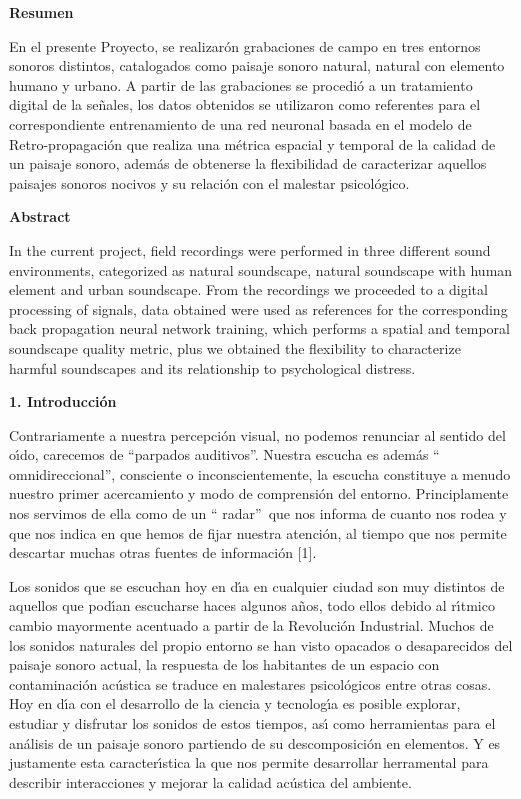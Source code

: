 \textbf{Resumen }

En el presente Proyecto, se realizar\'{o}n grabaciones de campo en tres
entornos sonoros distintos, catalogados como paisaje sonoro natural, natural
con elemento humano y urbano. A partir de las grabaciones se procedi\'{o} a un
tratamiento digital de la se\~{n}ales, los datos obtenidos se utilizaron como
referentes para el correspondiente entrenamiento de una red neuronal basada en
el modelo de Retro-propagaci\'{o}n que realiza una m\'{e}trica espacial y
temporal de la calidad de un paisaje sonoro, adem\'{a}s de obtenerse la
flexibilidad de caracterizar aquellos paisajes sonoros nocivos y su
relaci\'{o}n con el malestar psicol\'{o}gico.

\textbf{Abstract }

In the current project, field recordings were performed in three different
sound environments, categorized as natural soundscape, natural soundscape with
human element and urban soundscape. From the recordings we proceeded to a
digital processing of signals, data obtained were used as references for the
corresponding back propagation neural network training, which performs a
spatial and temporal soundscape quality metric, plus we obtained the
flexibility to characterize harmful soundscapes and its relationship to
psychological distress.

\textbf{1. Introducci\'{o}n}

Contrariamente a nuestra percepci\'{o}n visual, no podemos renunciar al
sentido del o\'{\i}do, carecemos de \textquotedblleft parpados
auditivos\textquotedblright. Nuestra escucha es adem\'{a}s \textquotedblleft
omnidireccional\textquotedblright, consciente o inconscientemente, la escucha
constituye a menudo nuestro primer acercamiento y modo de comprensi\'{o}n del
entorno. Principlamente nos servimos de ella como de un \textquotedblleft
radar\textquotedblright\ que nos informa de cuanto nos rodea y que nos indica
en que hemos de fijar nuestra atenci\'{o}n, al tiempo que nos permite
descartar muchas otras fuentes de informaci\'{o}n [1].

Los sonidos que se escuchan hoy en d\'{\i}a en cualquier ciudad son muy
distintos de aquellos que pod\'{\i}an escucharse haces algunos a\~{n}os, todo
ellos debido al r\'{\i}tmico cambio mayormente acentuado a partir de la
Revoluci\'{o}n Industrial. Muchos de los sonidos naturales del propio entorno
se han visto opacados o desaparecidos del paisaje sonoro actual, la respuesta
de los habitantes de un espacio con contaminaci\'{o}n ac\'{u}stica se traduce
en malestares psicol\'{o}gicos entre otras cosas. Hoy en d\'{\i}a con el
desarrollo de la ciencia y tecnolog\'{\i}a es posible explorar, estudiar y
disfrutar los sonidos de estos tiempos, as\'{\i} como herramientas para el
an\'{a}lisis de un paisaje sonoro partiendo de su descomposici\'{o}n en
elementos. Y es justamente esta caracter\'{\i}stica la que nos permite
desarrollar herramental para describir interacciones y mejorar la calidad
ac\'{u}stica del ambiente.

